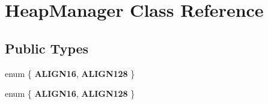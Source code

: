 \hypertarget{classHeapManager}{}\section{Heap\+Manager Class Reference}
\label{classHeapManager}
\subsection*{Public Types}
\begin{DoxyCompactItemize}
\item 
\mbox{\label{classHeapManager_a7a647ab97bbb614d4df436c6147908f5}} 
enum \{ {\bfseries A\+L\+I\+G\+N16}, 
{\bfseries A\+L\+I\+G\+N128}
 \}
\item 
\mbox{\label{classHeapManager_a37660dba5f88b156b6a396b35df8cb2f}} 
enum \{ {\bfseries A\+L\+I\+G\+N16}, 
{\bfseries A\+L\+I\+G\+N128}
 \}
\end{DoxyCompactItemize}
